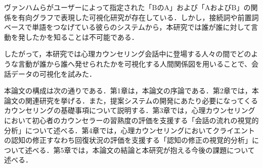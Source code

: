 \documentclass[shuuron]{kuee}
\begin{document}
ヴァンハム\cite{van2009mapping}らがユーザーによって指定された「BのA」および「AおよびB」の関係を有向グラフで表現した可視化研究が存在している．しかし，接続詞や前置詞ベースで単語をつなげている彼らのシステムから，本研究では誰が誰に対して言動を発したかを知ることは不可能である．


したがって，本研究では心理カウンセリング会話中に登場する人々の間でどのような言動が誰から誰へ発せられたかを可視化する人間関係図を用いることで、会話データの可視化を試みた．

本論文の構成は次の通りである．第1章は，本論文の序論である．第2章では，本論文の関連研究を挙げる．また，提案システムの開発にあたり必要になってくるカウンセリングの基礎事項について説明する．第3章では，心理カウンセリングにおいて初心者のカウンセラーの習熟度の評価を支援する「会話の流れの視覚的分析」について述べる．第4章では，心理カウンセリングにおいてクライエントの認知の修正すなわち回復状況の評価を支援する「認知の修正の視覚的分析」について述べる．第5章では，本論文の結論と本研究が抱える今後の課題について述べる．

%
\end{document}
